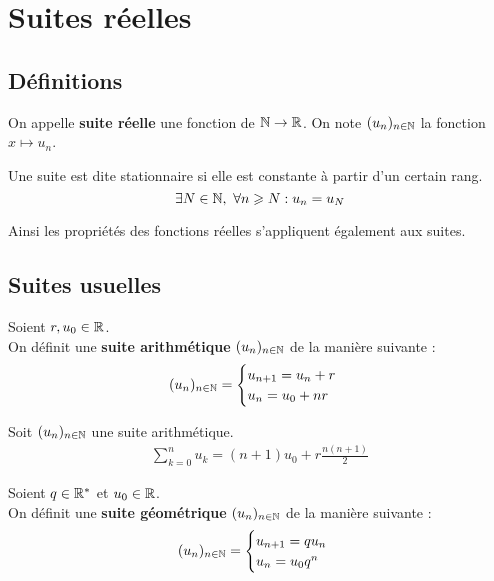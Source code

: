 \chapter{Suites réelles}
\def\arraystretch{1}

\section{Définitions}

\begin{definition}
    On appelle \textbf{suite réelle} une fonction de $\mathbb{N} \to \mathbb{R}$. 
    On note $(u_n)_{n \in \mathbb{N}}$ la fonction $x \mapsto u_n$.
\end{definition}

\begin{definition}
	Une suite est dite stationnaire si elle est constante à partir d'un certain rang. 
	\[ \exists N \in \mathbb{N},\ \forall n \geqslant N : u_n = u_N \]
\end{definition}

\begin{remark}
    Ainsi les propriétés des fonctions réelles s'appliquent également aux suites.
\end{remark}

\section{Suites usuelles}
\begin{definition}
    Soient $r, u_0 \in \mathbb{R}$.
    \\
    On définit une \textbf{suite arithmétique} $(u_n)_{n \in \mathbb{N}}$ de la manière suivante :
    \begin{align*}
        (u_n)_{n \in \mathbb{N}} =
        \begin{cases}
            u_{n+1} = u_n + r \\ 
            u_n = u_0 + nr
        \end{cases}
    \end{align*}
\end{definition}

\begin{proposition}
    Soit $(u_n)_{n \in \mathbb{N}}$ une suite arithmétique.
    \begin{align*}
        \sum_{k = 0}^{n} u_k = (n+1)u_0 + r \frac{n(n+1)}{2}
    \end{align*}
\end{proposition}

\begin{definition}
    Soient $q \in \mathbb{R}^*$ et $u_0 \in \mathbb{R}$.
    \\
    On définit une \textbf{suite géométrique} $(u_n)_{n \in \mathbb{N}}$ de la manière suivante : 
    \begin{align*}
        (u_n)_{n \in \mathbb{N}} = 
        \begin{cases}
            u_{n+1} = qu_n \\
            u_n = u_0 q^n
        \end{cases}
    \end{align*}
\end{definition}

